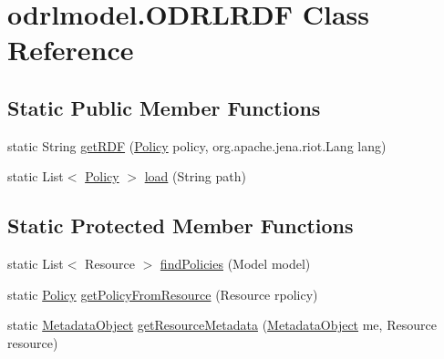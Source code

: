 \hypertarget{classodrlmodel_1_1_o_d_r_l_r_d_f}{\section{odrlmodel.\-O\-D\-R\-L\-R\-D\-F Class Reference}
\label{classodrlmodel_1_1_o_d_r_l_r_d_f}
}
\subsection*{Static Public Member Functions}
\begin{DoxyCompactItemize}
\item 
static String \hyperlink{classodrlmodel_1_1_o_d_r_l_r_d_f_a217d73cee9780229436b4ad2d98eca22}{get\-R\-D\-F} (\hyperlink{classodrlmodel_1_1_policy}{Policy} policy, org.\-apache.\-jena.\-riot.\-Lang lang)
\item 
static List$<$ \hyperlink{classodrlmodel_1_1_policy}{Policy} $>$ \hyperlink{classodrlmodel_1_1_o_d_r_l_r_d_f_afe66fe4ccf0780c07d654607ca7ee159}{load} (String path)
\end{DoxyCompactItemize}
\subsection*{Static Protected Member Functions}
\begin{DoxyCompactItemize}
\item 
static List$<$ Resource $>$ \hyperlink{classodrlmodel_1_1_o_d_r_l_r_d_f_a0d61c9c15a0e5296cab48afe3d0ed765}{find\-Policies} (Model model)
\item 
static \hyperlink{classodrlmodel_1_1_policy}{Policy} \hyperlink{classodrlmodel_1_1_o_d_r_l_r_d_f_afe953ba08b36a15201b93de16912de1c}{get\-Policy\-From\-Resource} (Resource rpolicy)
\item 
static \hyperlink{classodrlmodel_1_1_metadata_object}{Metadata\-Object} \hyperlink{classodrlmodel_1_1_o_d_r_l_r_d_f_a42a859cda846744821b08091079dba91}{get\-Resource\-Metadata} (\hyperlink{classodrlmodel_1_1_metadata_object}{Metadata\-Object} me, Resource resource)
\end{DoxyCompactItemize}
